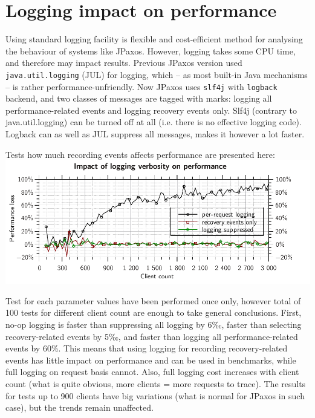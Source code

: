 \section{Logging impact on performance}

Using standard logging facility is flexible and cost-efficient method for analysing the behaviour of systems like JPaxos.
However, logging takes some CPU time, and therefore may impact results.
Previous JPaxos version used \texttt{java.util.logging} (JUL) for logging, which -- as most built-in Java mechanisms -- is rather performance-unfriendly.
Now JPaxos uses \texttt{slf4j} with \texttt{logback} backend, and two classes of messages are tagged with marks: logging all performance-related events and logging recovery events only.
Slf4j (contrary to java.util.logging) can be turned off at all (i.e. there is no effective logging code). Logback can as well as JUL suppress all messages, makes it however a lot faster.

Tests how much recording events affects performance are presented here:\\
\includegraphics{varia/log_impact.pdf}

Test for each parameter values have been performed once only, however total of 100 tests for different client count are enough to take general conclusions. First, no-op logging is faster than suppressing all logging by 6‰, faster than selecting recovery-related events by 5‰, and faster than logging all performance-related events by 60\%. This means that using logging for recording recovery-related events has little impact on performance and can be used in benchmarks, while full logging on request basis cannot.
Also, full logging cost increases with client count (what is quite obvious, more clients = more requests to trace).
The results for tests up to 900 clients have big variations (what is normal for JPaxos in such case), but the trends remain unaffected.